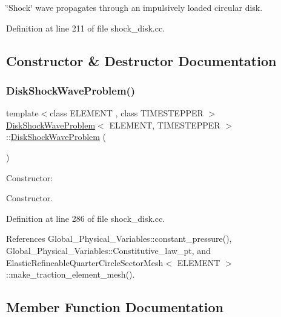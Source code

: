 \char`\"{}\+Shock\char`\"{} wave propagates through an impulsively loaded circular disk. 

Definition at line 211 of file shock\+\_\+disk.\+cc.



\subsection{Constructor \& Destructor Documentation}
\mbox{\label{classDiskShockWaveProblem_ae670d0120936f410134ba3e3b61aa880}} 
\subsubsection{\texorpdfstring{Disk\+Shock\+Wave\+Problem()}{DiskShockWaveProblem()}}
{\footnotesize\ttfamily template$<$class E\+L\+E\+M\+E\+NT , class T\+I\+M\+E\+S\+T\+E\+P\+P\+ER $>$ \\
\hyperlink{classDiskShockWaveProblem}{Disk\+Shock\+Wave\+Problem}$<$ E\+L\+E\+M\+E\+NT, T\+I\+M\+E\+S\+T\+E\+P\+P\+ER $>$\+::\hyperlink{classDiskShockWaveProblem}{Disk\+Shock\+Wave\+Problem} (\begin{DoxyParamCaption}{ }\end{DoxyParamCaption})}



Constructor\+: 

Constructor. 

Definition at line 286 of file shock\+\_\+disk.\+cc.



References Global\+\_\+\+Physical\+\_\+\+Variables\+::constant\+\_\+pressure(), Global\+\_\+\+Physical\+\_\+\+Variables\+::\+Constitutive\+\_\+law\+\_\+pt, and Elastic\+Refineable\+Quarter\+Circle\+Sector\+Mesh$<$ E\+L\+E\+M\+E\+N\+T $>$\+::make\+\_\+traction\+\_\+element\+\_\+mesh().



\subsection{Member Function Documentation}
\mbox{\label{classDiskShockWaveProblem_ac2a22a8399355e461d1a9ad1e5425c9a}} 
